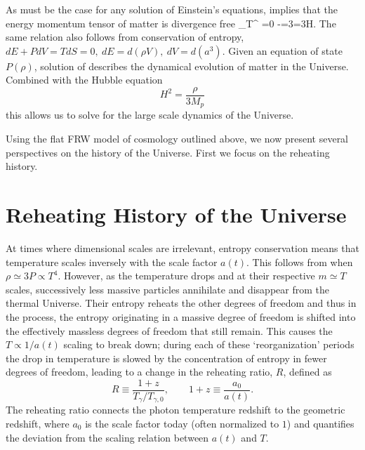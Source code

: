 As must be the case for any solution of Einstein's equations,    implies that the energy momentum tensor of matter is divergence free
\beqn\label{divTmn}
\nabla_\nu T^{\mu\nu} =0 \Rightarrow -=3=3H.
\eeqn
 The same relation also follows from  conservation of entropy, $dE+PdV=TdS=0,\  dE=d(\rho V),\  dV=d(a^3)$. Given an equation of state $P(\rho)$, solution of  describes the dynamical evolution of matter in the Universe. Combined with the Hubble equation
\begin{equation}\label{Hubble_eq}
H^2=\frac{\rho}{3M_p}
\end{equation}
this allows us to solve for the large scale dynamics of the Universe. 

Using the flat FRW model of cosmology outlined above, we now present several perspectives on the history of the Universe.  First we focus on the reheating history. 

\section{Reheating History of the Universe}\label{Eralink}

At times where dimensional scales are irrelevant, entropy conservation means that  temperature scales inversely with the scale factor $a(t)$. This follows from  when $ \rho\simeq 3P   \propto T^4$. However, as the temperature drops and at their respective $m\simeq T$ scales, successively less massive particles annihilate and disappear from the thermal Universe. Their entropy reheats the other degrees of freedom and thus in the process, the entropy originating in a massive degree of freedom is shifted into the effectively massless degrees of freedom that still remain.  This causes the  $T\propto 1/a(t)$ scaling to break down; during each of these `reorganization' periods the drop in temperature is slowed by the concentration of entropy in fewer degrees of freedom, leading to a change in the reheating ratio, $R$, defined as
\begin{equation}\label{redshiftratio}
R\equiv \frac{1+z}{ T_\gamma/T_{\gamma,0}}, \qquad 1+z\equiv \frac{a_{0}}{a(t)}.
\end{equation}
The reheating ratio connects the photon temperature redshift to the geometric redshift, where $a_0$ is the scale factor today (often normalized to $1$) and quantifies the deviation from the scaling relation between $a(t)$ and $T$.

